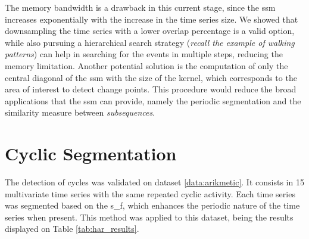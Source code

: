 \par
The memory bandwidth is a drawback in this current stage, since the \gls{ssm} increases exponentially with the increase in the time series size. We showed that downsampling the time series with a lower overlap percentage is a valid option, while also pursuing a hierarchical search strategy (\textit{recall the example of walking patterns}) can help in searching for the events in multiple steps, reducing the memory limitation. Another potential solution is the computation of only the central diagonal of the \gls{ssm} with the size of the kernel, which corresponds to the area of interest to detect change points. This procedure would reduce the broad applications that the \gls{ssm} can provide, namely the periodic segmentation and the similarity measure between \textit{subsequences}.

\section{Cyclic Segmentation}

The detection of cycles was validated on dataset \ref{data:arikmetic}. It consists in 15 multivariate time series with the same repeated cyclic activity. Each time series was segmented based on the \gls{s_f}, which enhances the periodic nature of the time series when present. This method was applied to this dataset, being the results displayed on Table \ref{tab:har_results}.


